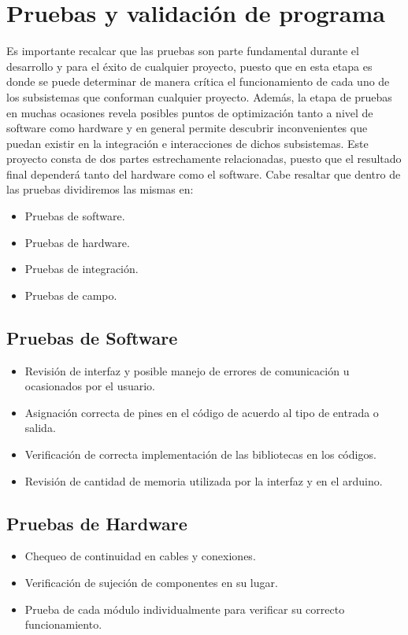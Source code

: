 \section{Pruebas y validación de programa}

Es importante recalcar que las pruebas son parte fundamental durante el desarrollo y para el éxito de cualquier proyecto, puesto que en esta etapa es donde se puede determinar de manera crítica el funcionamiento de cada uno de los subsistemas que conforman cualquier proyecto. Además, la etapa de pruebas en muchas ocasiones revela posibles puntos de optimización tanto a nivel de software como hardware y en general permite descubrir inconvenientes que puedan existir en la integración e interacciones de dichos subsistemas. 
Este proyecto consta de dos partes estrechamente relacionadas, puesto que el resultado final dependerá tanto del hardware como el software. Cabe resaltar que dentro de las pruebas dividiremos las mismas en:

\begin{itemize}
    \item Pruebas de software.
    \item Pruebas de hardware.
    \item Pruebas de integración.
    \item Pruebas de campo.
\end{itemize}

\subsection{Pruebas de Software}
\begin{itemize}
    \item Revisión de interfaz y posible manejo de errores de comunicación u ocasionados por el usuario.
    \item Asignación correcta de pines en el código de acuerdo al tipo de entrada o salida. 
    \item Verificación de correcta implementación de las bibliotecas en los códigos.
    \item Revisión de cantidad de memoria utilizada por la interfaz y en el arduino.
\end{itemize}

\subsection{Pruebas de Hardware}
\begin{itemize}
    \item Chequeo de continuidad en cables y conexiones.
    \item Verificación de sujeción de componentes en su lugar.
    \item Prueba de cada módulo individualmente para verificar su correcto funcionamiento. 
\end{itemize}

